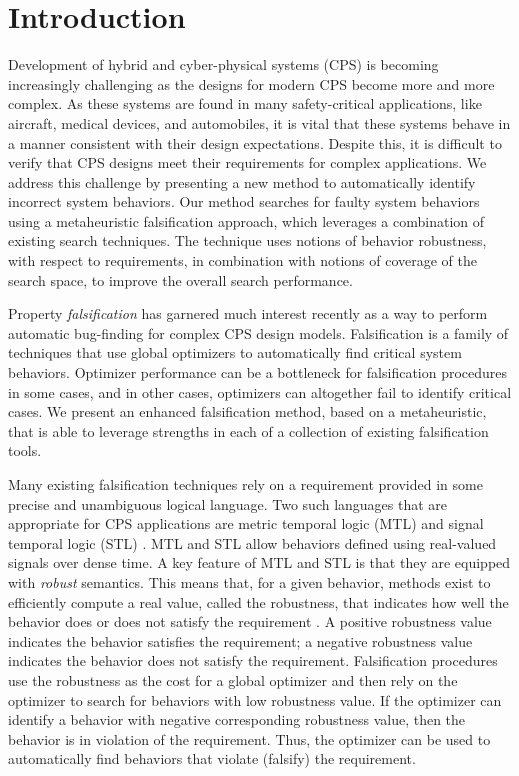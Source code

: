 \section{Introduction} \label{sec:introduction}

Development of hybrid and cyber-physical systems (CPS) is becoming increasingly challenging as the designs for modern CPS become more and more complex.
As these systems are found in many safety-critical applications, like aircraft, medical devices, and automobiles, it is vital that these systems behave in a manner consistent with their design expectations. Despite this, it is difficult to verify that CPS designs meet their requirements for complex applications.
We address this challenge by presenting a new method to automatically identify incorrect system behaviors.
Our method searches for faulty system behaviors using a metaheuristic falsification approach, which leverages a combination of existing search techniques.
The technique uses notions of behavior robustness, with respect to requirements, in combination with notions of coverage of the search space, to improve the overall search performance.

Property \emph{falsification} has garnered much interest recently as a way to perform automatic bug-finding for complex CPS design models.
Falsification is a family of techniques that use global optimizers to automatically find critical system behaviors.
Optimizer performance can be a bottleneck for falsification procedures in some cases, and in other cases, optimizers can altogether fail to identify critical cases.
We present an enhanced falsification method, based on a metaheuristic, that is able to leverage strengths in each of a collection of existing falsification tools. %

Many existing falsification techniques rely on a requirement provided in some precise and unambiguous logical language. Two such languages that are appropriate for CPS applications are metric temporal logic (MTL) and signal temporal logic (STL) \cite{Koymans1990,MalerN04}.
MTL and STL allow behaviors defined using real-valued signals over dense time.
A key feature of MTL and STL is that they are equipped with \emph{robust} semantics. This means that, for a given behavior, methods exist to efficiently compute a real value, called the robustness, that indicates how well the behavior does or does not satisfy the requirement \cite{FainekosP06fates,DonzeM10}. A positive robustness value indicates the behavior satisfies the requirement; a negative robustness value indicates the behavior does not satisfy the requirement. 
Falsification procedures use the robustness as the cost for a global optimizer and then rely on the optimizer to search for behaviors with low robustness value. If the optimizer can identify a behavior with negative corresponding robustness value, then the behavior is in violation of the requirement. Thus, the optimizer can be used to automatically find behaviors that violate (falsify) the requirement.

